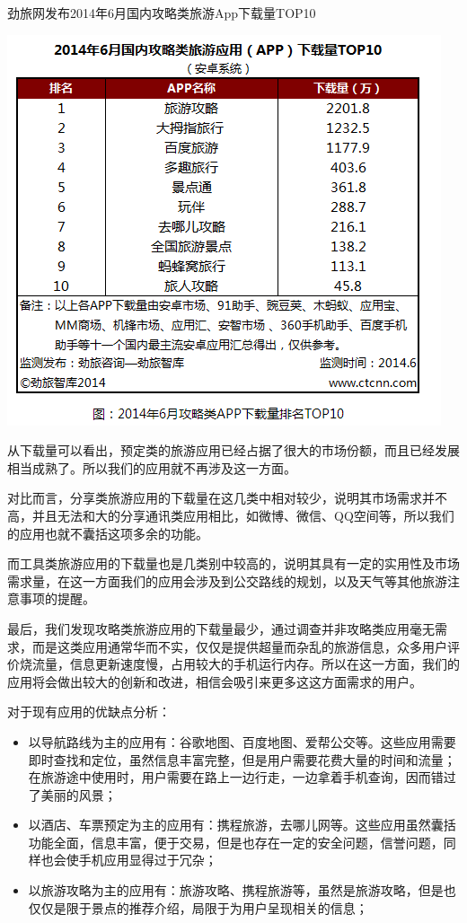 \documentclass[12pt,a4paper]{article}
\begin{document}
\begin{CJK}{UTF8}{gbsn}
	劲旅网发布2014年6月国内攻略类旅游App下载量TOP10
	\begin{center}
	\includegraphics[scale=0.8]{image5}
	\end{center}

	从下载量可以看出，预定类的旅游应用已经占据了很大的市场份额，而且已经发展相当成熟了。所以我们的应用就不再涉及这一方面。	

	对比而言，分享类旅游应用的下载量在这几类中相对较少，说明其市场需求并不高，并且无法和大的分享通讯类应用相比，如微博、微信、QQ空间等，所以我们的应用也就不囊括这项多余的功能。	

	而工具类旅游应用的下载量也是几类别中较高的，说明其具有一定的实用性及市场需求量，在这一方面我们的应用会涉及到公交路线的规划，以及天气等其他旅游注意事项的提醒。

	最后，我们发现攻略类旅游应用的下载量最少，通过调查并非攻略类应用毫无需求，而是这类应用通常华而不实，仅仅是提供超量而杂乱的旅游信息，众多用户评价烧流量，信息更新速度慢，占用较大的手机运行内存。所以在这一方面，我们的应用将会做出较大的创新和改进，相信会吸引来更多这这方面需求的用户。

	对于现有应用的优缺点分析：
	\begin{itemize}
	\item 以导航路线为主的应用有：谷歌地图、百度地图、爱帮公交等。这些应用需要即时查找和定位，虽然信息丰富完整，但是用户需要花费大量的时间和流量；在旅游途中使用时，用户需要在路上一边行走，一边拿着手机查询，因而错过了美丽的风景；
	\item 以酒店、车票预定为主的应用有：携程旅游，去哪儿网等。这些应用虽然囊括功能全面，信息丰富，便于交易，但是也存在一定的安全问题，信誉问题，同样也会使手机应用显得过于冗杂；
	\item 以旅游攻略为主的应用有：旅游攻略、携程旅游等，虽然是旅游攻略，但是也仅仅是限于景点的推荐介绍，局限于为用户呈现相关的信息；
	\end{itemize}


\end{CJK}
\end{document}
